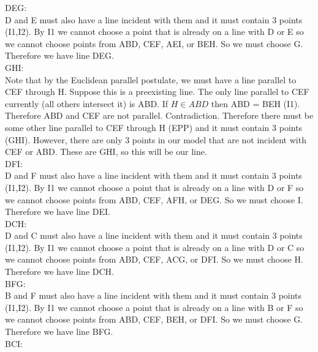 \documentclass[12pt,letterpaper]{article}
\begin{document}
\noindent DEG:\\

D and E must also have a line incident with them and it must contain 3 points (I1,I2).  By I1 we cannot choose a point that is already on a line with D or E so we cannot choose points from ABD, CEF, AEI, or BEH.  So we must choose G.  Therefore we have line DEG.\\

\noindent GHI:\\

Note that by the Euclidean parallel postulate, we must have a line parallel to CEF through H.  Suppose this is a preexisting line.  The only line parallel to CEF currently (all others intersect it) is ABD.  If $H\in ABD$ then ABD = BEH (I1).  Therefore ABD and CEF are not parallel.  Contradiction.  Therefore there must be some other line parallel to CEF through H (EPP) and it must contain 3 points (GHI).  However, there are only 3 points in our model that are not incident with CEF or ABD. These are GHI, so this will be our line.\\

\noindent DFI:\\

D and F must also have a line incident with them and it must contain 3 points (I1,I2).  By I1 we cannot choose a point that is already on a line with D or F so we cannot choose points from ABD, CEF, AFH, or DEG.  So we must choose I.  Therefore we have line DEI.\\



\noindent DCH:\\

D and C must also have a line incident with them and it must contain 3 points (I1,I2).  By I1 we cannot choose a point that is already on a line with D or C so we cannot choose points from ABD, CEF, ACG, or DFI.  So we must choose H.  Therefore we have line DCH.\\

\noindent BFG:\\

B and F must also have a line incident with them and it must contain 3 points (I1,I2).  By I1 we cannot choose a point that is already on a line with B or F so we cannot choose points from ABD, CEF, BEH, or DFI.  So we must choose G.  Therefore we have line BFG.\\


\noindent BCI:\\
\end{document}
